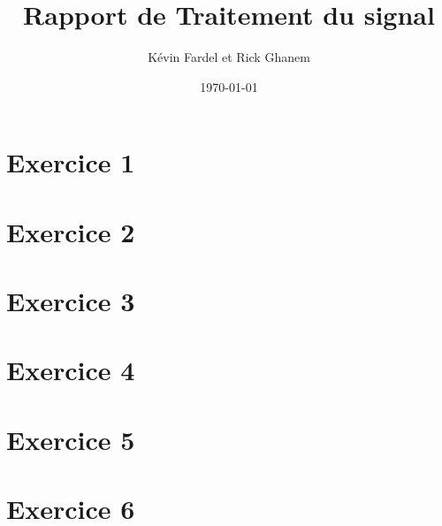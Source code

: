 \documentclass[a4paper, 11pt]{article}           %
\author{Kévin Fardel et Rick Ghanem}
\date{\today}
\title{Rapport de Traitement du signal}
\begin{document}

\maketitle %

\begin{abstract}
\end{abstract}

\tableofcontents %

\lstlistoflistings %

\newpage
\part{Exercice 1}

\part{Exercice 2}

\part{Exercice 3}

\part{Exercice 4}

\part{Exercice 5}

\part{Exercice 6}

\end{document}
